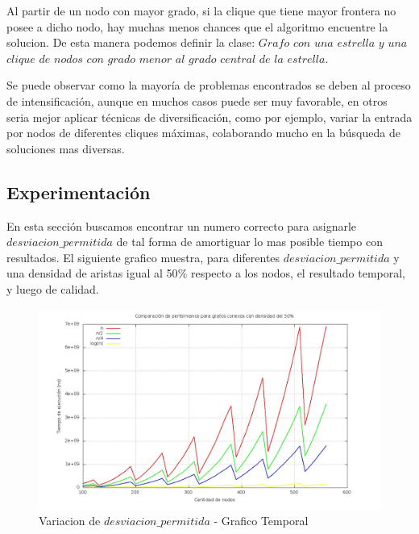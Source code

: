  Al partir de un nodo con mayor grado, si la clique que tiene mayor frontera no posee a dicho nodo, hay muchas menos chances que el algoritmo encuentre la solucion. De esta manera podemos definir la clase:
 $Grafo$ $con$ $una$ $estrella$ $y$ $una$ $clique$ $de$ $nodos$ $con$ $grado$ $menor$ $al$ $grado$ $central$ $de$ $la$ $estrella.$ 

Se puede observar como la mayoría de problemas encontrados se deben al proceso de intensificación, aunque en muchos casos puede ser muy favorable, en otros seria mejor aplicar técnicas de diversificación, como por ejemplo, variar la entrada por nodos de diferentes cliques máximas, colaborando mucho en la búsqueda de soluciones mas diversas.

\subsection{Experimentación}

 En esta sección buscamos encontrar un numero correcto para asignarle $desviacion\_permitida$ de tal forma de amortiguar lo mas posible tiempo con resultados. \newline
 El siguiente grafico muestra, para diferentes $desviacion\_permitida$ y una densidad de aristas igual al 50$\%$ respecto a los nodos, el resultado temporal, y luego de calidad.


\begin{figure}[H] %
\begin{center}
\includegraphics[width=350pt]{../imgs/variaciontemporal_tabu.jpg}
\caption{Variacion de $desviacion\_permitida$ - Grafico Temporal}
\end{center}
\end{figure}

